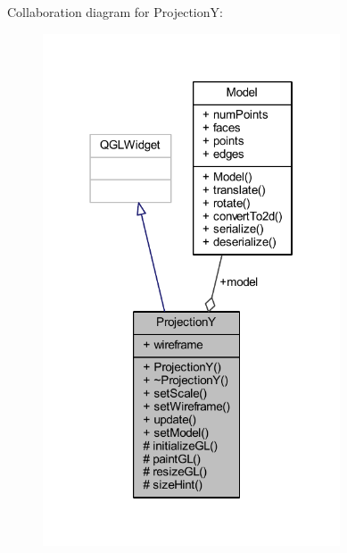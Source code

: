 Collaboration diagram for ProjectionY\+:\nopagebreak
\begin{figure}[H]
\begin{center}
\leavevmode
\includegraphics[width=250pt]{class_projection_y__coll__graph}
\end{center}
\end{figure}
